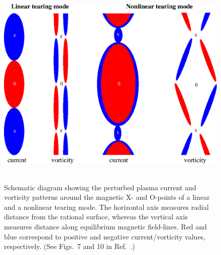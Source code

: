 \documentclass[12pt,prb,aps]{revtex4-1}
\begin{document}
\begin{figure}
\includegraphics[height=4in]{fig14.pdf}
\caption{Schematic diagram showing the perturbed plasma current and vorticity patterns around the magnetic X- and O-points of a linear and a nonlinear tearing mode. 
The horizontal axis measures radial distance from the rational
surface, whereas the vertical axis measures distance along equilibrium magnetic field-lines. Red and blue
correspond to positive and negative current/vorticity values, respectively. (See Figs.~7 and 10 in 
Ref.~.)}\label{fig14}
\end{figure}
\end{document}
